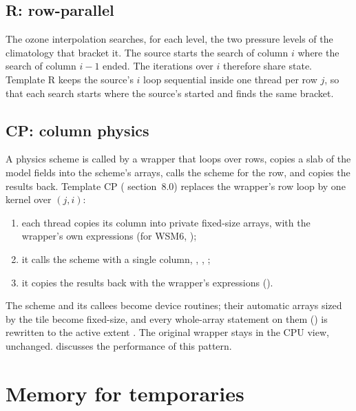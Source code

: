 \subsection{R: row-parallel}

The ozone interpolation  searches, for each level, the two pressure levels of the climatology that
bracket it. The source starts the search of column $i$ where the search of column $i-1$ ended. The iterations over
$i$ therefore share state. Template R keeps the source's $i$ loop sequential inside one thread per row $j$, so that
each search starts where the source's started and finds the same bracket.

\subsection{CP: column physics}

A physics scheme is called by a wrapper that loops over rows, copies a slab of the model fields into the scheme's
arrays, calls the scheme for the row, and copies the results back. Template CP ( section~8.0) replaces
the wrapper's row loop by one kernel over $(j,i)$:
\begin{enumerate}
  \item each thread copies its column into private fixed-size arrays, with the wrapper's own expressions (for WSM6,
    );
  \item it calls the scheme with a single column, , , ;
  \item it copies the results back with the wrapper's expressions ().
\end{enumerate}
The scheme and its callees become device routines; their automatic arrays sized by the tile become fixed-size, and
every whole-array statement on them () is rewritten to the active extent . The original
wrapper stays in the CPU view, unchanged.  discusses the performance of this pattern.

\section{Memory for temporaries}

